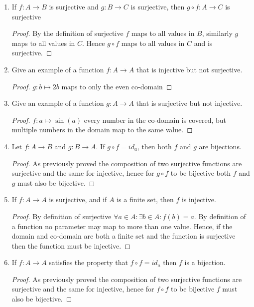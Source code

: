 \documentclass{article}
\begin{document}
\begin{enumerate}
\begin{proof}
    \end{proof}
  \item If $f : A\to B$ is surjective and $g : B\to C$ is surjective, then $g \circ f : A\to C$ is surjective 
    \begin{proof}
         By the definition of surjective $f$ maps to all values in $B$, similarly $g$ maps to all values in $C$. Hence $g \circ f$ maps to all values in $C$ and is surjective. 
    \end{proof}
  \item Give an example of a function $f : A\to A$ that is injective but not surjective.
    \begin{proof}
      $g : b\mapsto 2b$ maps to only the even co-domain
    \end{proof}
  \item Give an example of a function $g : A\to A$ that is surjective but not injective. 
    \begin{proof}
       $f : a\mapsto \sin(a) $ every number in the co-domain is covered, but multiple numbers in the domain map to the same value.
     \end{proof}
  \item Let $f : A\to B$ and $g : B\to A$. If $g \circ f = id_{a}$, then both $f$ and $g$ are bijections.
   \begin{proof}
      As previously proved the composition of two surjective functions are surjective and the same for injective, hence for $g \circ f$ to be bijective both $f$ and $g$ must also be bijective.
    \end{proof}
  \item If $f : A\to A$ is surjective, and if $A$ is a finite set, then $f$ is injective.
    \begin{proof}
By definition of surjective $\forall a\in A: \exists b\in A: f(b) = a$. By definition of a function no parameter may map to more than one value. Hence, if the domain and co-domain are both a finite set and the function is surjective then the function must be injective.
    \end{proof}
  \item If $f : A\to A$ satisfies the property that $f \circ f = id_{a}$ then $f$ is a bijection.
    \begin{proof}
      As previously proved the composition of two surjective functions are surjective and the same for injective, hence for $f \circ f$ to be bijective $f$ must also be bijective.
    \end{proof}
  \end{enumerate}
\end{document}
